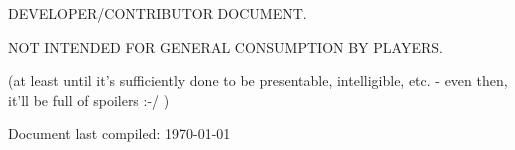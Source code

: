 \vspace{1cm}
\centerline{\LARGE DEVELOPER/CONTRIBUTOR DOCUMENT.}
\centerline{\LARGE NOT INTENDED FOR GENERAL CONSUMPTION BY PLAYERS.}
\vspace{0.5cm}
\centerline{(at least until it's sufficiently done to be presentable, intelligible, etc. - even then, it'll be full of spoilers :-/ )}
\vspace{3cm}
\centerline{Document last compiled: \today}

